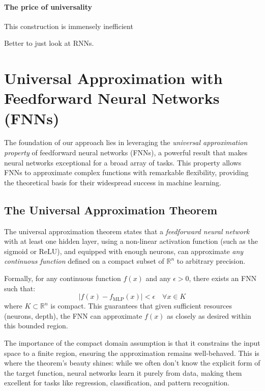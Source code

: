 \documentclass{article}
\theoremstyle{definition}
\theoremstyle{remark}
\begin{document}
\paragraph{The price of universality}
This construction is immensely inefficient

Better to just look at RNNs. 



\newpage




\newpage
\appendix 

\section{Universal Approximation with Feedforward Neural Networks (FNNs)}

The foundation of our approach lies in leveraging the \textit{universal approximation property} of feedforward neural networks (FNNs), a powerful result that makes neural networks exceptional for a broad array of tasks. This property allows FNNs to approximate complex functions with remarkable flexibility, providing the theoretical basis for their widespread success in machine learning.

\subsection{The Universal Approximation Theorem}

The universal approximation theorem states that a \textit{feedforward neural network} with at least one hidden layer, using a non-linear activation function (such as the sigmoid or ReLU), and equipped with enough neurons, can approximate \textit{any continuous function} defined on a compact subset of \(\mathbb{R}^n\) to arbitrary precision.

Formally, for any continuous function \(f(x)\) and any \(\epsilon > 0\), there exists an FNN such that:
\[
| f(x) - f_{\text{MLP}}(x) | < \epsilon \quad \forall x \in K
\]
where \(K \subset \mathbb{R}^n\) is compact. This guarantees that given sufficient resources (neurons, depth), the FNN can approximate \(f(x)\) as closely as desired within this bounded region.

The importance of the compact domain assumption is that it constrains the input space to a finite region, ensuring the approximation remains well-behaved.
This is where the theorem’s beauty shines: while we often don’t know the explicit form of the target function, neural networks learn it purely from data, making them excellent for tasks like regression, classification, and pattern recognition.
\end{document}
